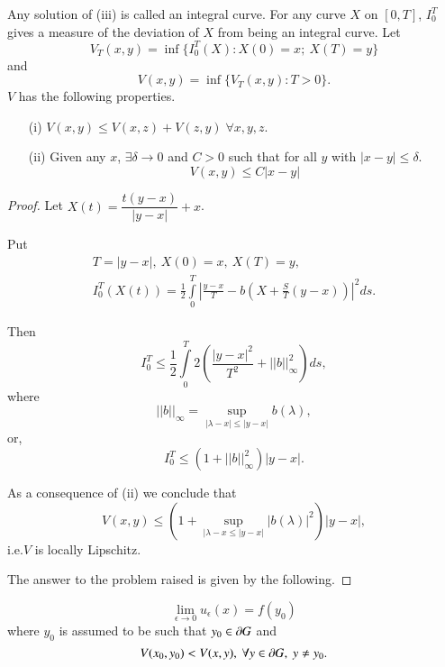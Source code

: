 \begin{remark*}
Any solution of (iii) is called an integral curve. For any curve $X$
on $[0,T]$, $I^{T}_{0}$ gives a measure of the deviation of $X$ from
being an integral curve. Let
$$
V_{T}(x,y)=\inf\{I^{T}_{0}(X):X(0)=x;\ X(T)=y\}
$$
and 
$$
V(x,y)=\inf\{V_{T}(x,y):T>0\}.
$$
$V$ has the following properties.
\begin{itemize}
\item[(i)] $V(x,y)\leq V(x,z)+V(z,y)\;\forall x,y,z$.\pageoriginale

\item[(ii)] Given any $x$, $\exists \delta\to 0$ and $C>0$ such that
  for all $y$ with $|x-y|\leq \delta$.
$$
V(x,y)\leq C|x-y|
$$
\end{itemize}
\end{remark*}

\begin{proof}
Let $X(t)=\dfrac{t(y-x)}{|y-x|}+x$.

Put
\begin{gather*}
T=|y-x|,\ X(0)=x,\ X(T)=y,\\
I^{T}_{0}(X(t))=\frac{1}{2}\int\limits^{T}_{0}\left|\frac{y-x}{T}-b(X+\frac{S}{T}(y-x))\right|^{2}ds. 
\end{gather*}

Then
$$
I^{T}_{0}\leq
\frac{1}{2}\int\limits^{T}_{0}2\left(\frac{|y-x|^{2}}{T^{2}}+||b||^{2}_{\infty}\right)ds,
$$
where
$$
||b||_{\infty}=\sup\limits_{|\lambda-x|\leq |y-x|}b(\lambda),
$$
or,
$$
I^{T}_{0}\leq (1+||b||^{2}_{\infty})|y-x|.
$$

As a consequence of (ii) we conclude that
$$
V(x,y)\leq \left(1+\sup\limits_{|\lambda-x\leq |y-x|}|b(\lambda)|^{2}\right)|y-x|,
$$
i.e.\@ $V$ is locally Lipschitz.

The answer to the problem raised is given by the following.
\end{proof}

\begin{theorem*}
$$
\lim\limits_{\epsilon\to 0}u_{\epsilon}(x)=f(y_{0})
$$
where $y_{0}$ is assumed to be such that $y_{0}\in \partial G$ and
$$
V(x_{0},y_{0})<V(x,y),\ \forall y\in \p G,\ y\neq y_{0}.
$$\pageoriginale
\end{theorem*}

